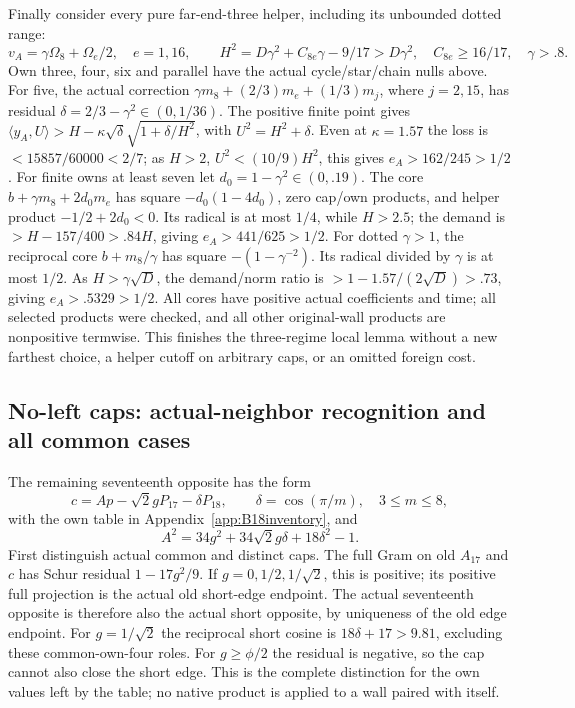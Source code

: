 \documentclass[11pt]{article}
\theoremstyle{definition}
\theoremstyle{remark}
\newcommand{\ip}[2]{\langle #1,#2\rangle}
\begin{document}
Finally consider every pure far-end-three helper, including its
unbounded dotted range:
\[
 v_A=\gamma\Omega_8+\Omega_e/2,\quad e=1,16,\qquad
 H^2=D\gamma^2+C_{8e}\gamma-9/17>D\gamma^2,\quad
 C_{8e}\geq16/17,\quad \gamma>.8 .
\]
Own three, four, six and parallel have the actual cycle/star/chain
nulls above. For five, the actual correction
\(\gamma m_8+(2/3)m_e+(1/3)m_j\), where \(j=2,15\),
has residual \(\delta=2/3-\gamma^2\in(0,1/36)\).
The positive finite point gives
\(\ip{y_A}U>H-\kappa\sqrt\delta\sqrt{1+\delta/H^2}\),
with \(U^2=H^2+\delta\).
Even at \(\kappa=1.57\) the loss is \(<15857/60000<2/7\);
as \(H>2\), \(U^2<(10/9)H^2\), this gives
\(e_A>162/245>1/2\).
For finite owns at least seven let \(d_0=1-\gamma^2\in(0,.19)\).
The core \(b+\gamma m_8+2d_0m_e\) has square
\(-d_0(1-4d_0)\), zero cap/own products,
and helper product \(-1/2+2d_0<0\).
Its radical is at most \(1/4\), while \(H>2.5\);
the demand is \(>H-157/400>.84H\), giving \(e_A>441/625>1/2\).
For dotted \(\gamma>1\), the reciprocal core \(b+m_8/\gamma\)
has square \(-(1-\gamma^{-2})\).
Its radical divided by \(\gamma\) is at most \(1/2\).
As \(H>\gamma\sqrt D\), the demand/norm ratio is
\(>1-1.57/(2\sqrt D)>.73\), giving \(e_A>.5329>1/2\).
All cores have positive actual coefficients and time; all selected
products were checked, and all other original-wall products
are nonpositive termwise.
This finishes the three-regime local lemma without a new farthest
choice, a helper cutoff on arbitrary caps, or an omitted foreign cost.

\subsection{No-left caps: actual-neighbor recognition and all common cases}
\label{app:B18noleft}
The remaining seventeenth opposite has the form
\[
 c=Ap-\sqrt2gP_{17}-\delta P_{18},\qquad
 \delta=\cos(\pi/m),\quad 3\leq m\leq8,
\]
with the own table in Appendix~\ref{app:B18inventory}, and
\[
 A^2=34g^2+34\sqrt2g\delta+18\delta^2-1 .
\]
First distinguish actual common and distinct caps.
The full Gram on old \(A_{17}\) and \(c\) has Schur residual
\(1-17g^2/9\). If \(g=0,1/2,1/\sqrt2\), this is positive;
its positive full projection is the actual old short-edge endpoint.
The actual seventeenth opposite is therefore also the actual short
opposite, by uniqueness of the old edge endpoint.
For \(g=1/\sqrt2\) the reciprocal short cosine is
\(18\delta+17>9.81\), excluding these common-own-four roles.
For \(g\geq\phi/2\) the residual is negative, so the cap cannot
also close the short edge. This is the complete distinction for
the own values left by the table; no native product is applied to
a wall paired with itself.
\end{document}
